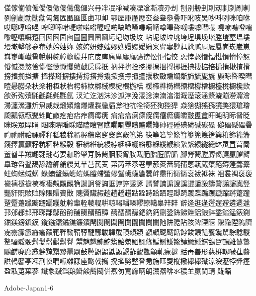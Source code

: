 傞傢僃僨僱僾儇儌儍儎儳儸兴冄冸冺凈减凑凓凔凘凟刅刦
刨别刱刲刵刼剚剠剮剸剹劊劌勡勩勱匃匑匟匭匲匽卥卭卹
卾厔厙厪厯厺叁叄叅叠吓吪吱吴吵呌咧咪咱咻哎哪哼唅唈
唕唧唪唶啑啦喏喒喔喤喲嗃嗆嗓嗛嗬嗮嗱嗶嗸嘅嘍嘑嘒嘬
嘵嘹噍噔嚅嚟嚦嚷囌囏囙囡囫园囱圇圌圚圛圝圬圮圽圾坟
坫坭坺垃垗垮埕埧堍堦塍塏塟塭塿墁墘墼够夣奙她妗妯妳
姟姱姸媲媸嫪嫶嬛嬝嬡嬸宷寗寠尟尪尬尶屙屜屭峝崁崴崽
嵙嵾嶃巇巹帨帲帵幛幨幪幷庀庋庳庽廑廔廕彍徬忪怇恉恔
恧悻惄惽愊愖愪愶慞慤慻慽慿憝憸懜懢懥懨戄戇戱戹戽扺
抐抨拚拴挖挪挶捆捋捓捱捵捿掂掊掮掯揪揸揹搒搘搠搤搪
搵搽搿摒摟摴撐撘撙撬撳擭擰攛攟攮敉敠斒斕斴斾旈旎旐
旟晾暋暌暳曀曏朥朵杕枀枏枑枤枱枵枾栨梆棫棵椗椳椸楛
楥榨榫榯槥槱橊橕橧橱檯櫈櫉欃欻欿歽歾殰毷毹氄氉氍氬
汊汒汔汹沬沴泒浡浼涹淰湅湳湻湽溉溼滚滛漦漩漰澇澝澮
澷瀍瀠灉炘炰烕烖煅熲燴爗爟牃牏牐牚牠牨牷犄狉狥狴猂
猋猞猢猺猻獍獘獧瑲璯瓟瓤瓴瓻甖甡甿畞疙疤痁痄痌痗痜
痡痯瘄瘌瘝瘲瘸癅癊癟皭皽盙盫盰盹眀眎眢眨眯眹眾睅睊
睏睞睤睧睬瞄瞌瞍瞖瞧瞯瞷瞾矉矑矙矱砷硜硾碘碡碱碳磉
磓礌礟礧礨礿祂祔祫祼禫秄秪稂稌稰稺穄窀窆窔窵窽竾笫
筷箠箬箰篨篲篸篼篾簉簨簯籂籒籓籛籜籝籲籽粇粞粺糇糓
糚紼絍綂綅綍綑綞綳綹緐緥緵緶縯縶繄繯繸纁缽罛罝罥罱
罿羀羋羢翽翾翿耇耍耞耹肈肎胏胔胭胰胷胺胾脃脗脰腗腯
腳膋膐膛膞臋臕臝臞臡臯臶舀舋舓舔舚舺艄艭芄芉芑芪芰
苐苪苯苶荖荸菸菼葘蒓蒱蒽蓻蕆蕖蕝薅薘虂虆蛀蜔蜢蜮蜹
蝝蝻螌螎螗螘螞螣螮螿蟉蟚蠘蠛蠭蠺衅衋衎衕衚衮袚袛袜
裍裠裯褎褏褦褵襚襜襫襰襼覥覵覼觕詉詗詧詾誆誖誶諉諑
諝諬諵謆謏謑譅譒譭譸譼譾讅讟豋豓豻貺賅賉賒賬賵賷贁
贃贗贜赮趑趟趫趲跕跧跱跲跴踁踋踦踱蹀蹁蹍蹏蹜蹡蹩蹱
蹵蹷躉躐躕躚躧躩躭軨軰輇輘輥輧輬輵輺轃轇轑轕辠辡辢
辥逄逛逯遌遛遰遴遹邋邘邠邲邽郉郰鄅鄥酚酧酺醊醑醕醰
醻醽釂釅鈀鈉鈣鉶銎銯銻銼鋁鋃鋅鋈錔錳錶鍘鍿鎂鎊鎻鏌
鏦鏹鐂鐍鐎鐮鑌閈閡閿闆闉闑闒闠闤闦阤阱阸阽陔陴陻陿
隁隃隉隖隮霃霛霡霢霨霱靧靶靽靿鞙鞟鞬鞹韍韠韯頇頦頮
顢顣颴飅餂餑餕餵饈饔饞駡騌騐騣驁驑骽骾鬁鬉鬋鬍鬎鬙
鬵魈魕魨鮀鮆鮐鮝鮰鮿鯈鯿鰂鰜鰵鱄鱖鱡鱨鴰鴽鵪鵻鷥鷩
鷳鹺麂麃麄麰黤黰黲鼉鼏鼔鼛鼢鼦鼪鼫鼴齚齯龞龥𠃵𤸄𤿲
𧵳再善形慈栟軔㗞龿鿀鿁鿂𪊲𠅘𠖱𠛬𫝓𠵘𫝚𫝜𥧌𫝶㦤㦸𢹂
𫝼㩜𠟈𢿫𧦴㫄㫋𫞂㪅𫞋㯳櫸𣟱𫞔鿌㴱𤁋㹀㢡𫞬𫞯𫟉𫟏𫟒𦲞
䜟𧰼䠞𫟰𫝥𫠍𫠗鬝鬬倂凞匇寬廊昞朗灊凞啡氺穠𦍌蠃閫靕
𩸽𪘚

Adobe-Japan1-6

